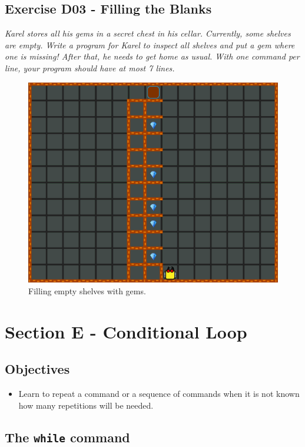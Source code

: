 \documentclass[article,A4,12pt]{llncs}
\begin{document}
{{{{\newpage




\subsection{Exercise D03 - Filling the Blanks}

{\em Karel stores all his gems in a secret chest in his cellar. 
Currently, some shelves are empty. Write a program for Karel to 
inspect all shelves and put a gem where one is missing! After that, he needs to get 
home as usual. With one 
command per line, your program should have at most 7 lines.}

\begin{figure}[!ht]
\begin{center}
\includegraphics[height=0.4\textwidth]{img/d03.png}
\end{center}
\vspace{-4mm}
\caption{Filling empty shelves with gems.}
\label{fig:d03}
\vspace{-4mm}
\end{figure}
\noindent



\section{Section E - Conditional Loop}

\subsection{Objectives} 
 
\begin{itemize}
\item Learn to repeat a command or a sequence of commands when it is not known 
      how many repetitions will be needed.
\end{itemize}

\subsection{The {\tt while} command}

}}}}
\end{document}
